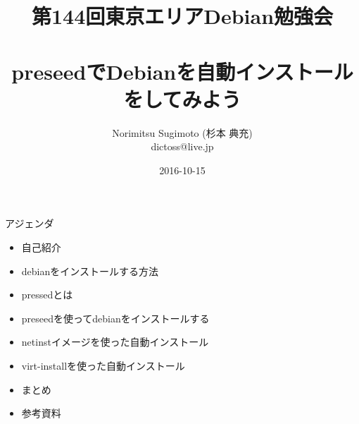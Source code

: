 \title{第144回東京エリアDebian勉強会 \\　\\preseedでDebianを自動インストールをしてみよう}
\subtitle{}
\author{Norimitsu Sugimoto (杉本 典充) \\dictoss@live.jp}
\date{2016-10-15}



\frame{\titlepage{}}


\begin{frame}{アジェンダ}
  \begin{itemize}
  \item 自己紹介
  \item debianをインストールする方法
  \item pressedとは
  \item preseedを使ってdebianをインストールする
  \item netinstイメージを使った自動インストール
  \item virt-installを使った自動インストール
  \item まとめ
  \item 参考資料
  \end{itemize}
\end{frame}


